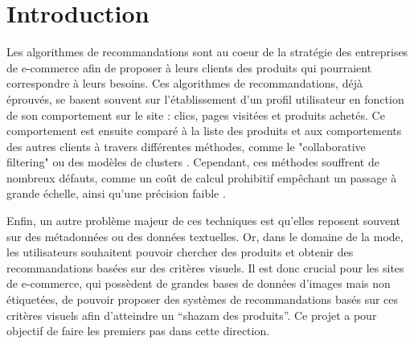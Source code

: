 \section*{Introduction}

Les algorithmes de recommandations sont au coeur de la stratégie des entreprises de e-commerce afin de proposer à leurs
clients des produits qui pourraient correspondre à leurs besoins. Ces algorithmes de recommandations, déjà éprouvés, se
basent souvent sur l'établissement d'un profil utilisateur en fonction de son comportement sur le site : clics, pages
visitées et produits achetés. Ce comportement est ensuite comparé à la liste des produits et aux comportements des
autres clients à travers différentes méthodes, comme le "collaborative filtering" ou des modèles de clusters
\cite{amazon2003linden}. Cependant, ces méthodes souffrent de nombreux défauts, comme un coût de calcul prohibitif
empêchant un passage à grande échelle, ainsi qu'une précision faible \cite{deep2017shankar}.

Enfin, un autre problème majeur de ces techniques est qu'elles reposent souvent sur des métadonnées ou des données
textuelles. Or, dans le domaine de la mode, les utilisateurs souhaitent pouvoir chercher des produits et obtenir des
recommandations basées sur des critères visuels. Il est donc crucial pour les sites de e-commerce, qui possèdent de
grandes bases de données d'images mais non étiquetées, de pouvoir proposer des systèmes de recommandations basés sur
ces critères visuels afin d’atteindre un “shazam des produits”. Ce projet a pour objectif de faire les premiers pas
dans cette direction. 

